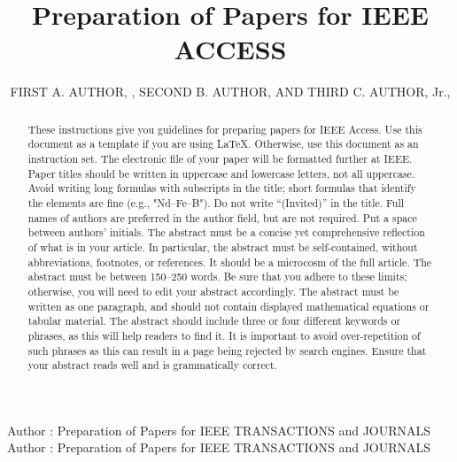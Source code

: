 \documentclass{ieeeaccess}
\begin{document}

\title{Preparation of Papers for IEEE ACCESS}
\author{\uppercase{First A. Author}, ,
\uppercase{Second B. Author}, AND \uppercase{Third C. Author},
Jr.,
}

\address[1]{National Institute of Standards and
Technology, Boulder, CO 80305 USA (e-mail: author@boulder.nist.gov)}
\address[2]{Department of Physics, Colorado State University, Fort Collins,
CO 80523 USA (e-mail: author@lamar.colostate.edu)}
\address[3]{Electrical Engineering Department, University of Colorado, Boulder, CO
80309 USA}

\markboth
{Author \headeretal: Preparation of Papers for IEEE TRANSACTIONS and JOURNALS}
{Author \headeretal: Preparation of Papers for IEEE TRANSACTIONS and JOURNALS}



\begin{abstract}
These instructions give you guidelines for preparing papers for
IEEE Access. Use this document as a template if you are
using \LaTeX. Otherwise, use this document as an
instruction set. The electronic file of your paper will be formatted further
at IEEE. Paper titles should be written in uppercase and lowercase letters,
not all uppercase. Avoid writing long formulas with subscripts in the title;
short formulas that identify the elements are fine (e.g., "Nd--Fe--B"). Do
not write ``(Invited)'' in the title. Full names of authors are preferred in
the author field, but are not required. Put a space between authors'
initials. The abstract must be a concise yet comprehensive reflection of
what is in your article. In particular, the abstract must be self-contained,
without abbreviations, footnotes, or references. It should be a microcosm of
the full article. The abstract must be between 150--250 words. Be sure that
you adhere to these limits; otherwise, you will need to edit your abstract
accordingly. The abstract must be written as one paragraph, and should not
contain displayed mathematical equations or tabular material. The abstract
should include three or four different keywords or phrases, as this will
help readers to find it. It is important to avoid over-repetition of such
phrases as this can result in a page being rejected by search engines.
Ensure that your abstract reads well and is grammatically correct.
\end{abstract}
\end{document}
